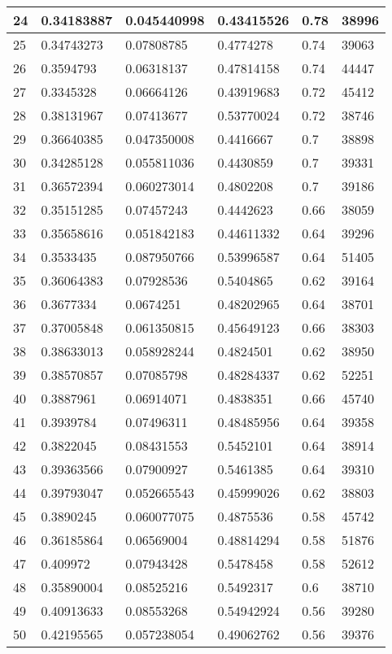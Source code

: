 \begin{longtable}{|l|l|l|l|l|l|}
24 & 0.34183887 & 0.045440998 & 0.43415526 & 0.78 & 38996 \\ \hline 
25 & 0.34743273 & 0.07808785 & 0.4774278 & 0.74 & 39063 \\ \hline 
26 & 0.3594793 & 0.06318137 & 0.47814158 & 0.74 & 44447 \\ \hline 
27 & 0.3345328 & 0.06664126 & 0.43919683 & 0.72 & 45412 \\ \hline 
28 & 0.38131967 & 0.07413677 & 0.53770024 & 0.72 & 38746 \\ \hline 
29 & 0.36640385 & 0.047350008 & 0.4416667 & 0.7 & 38898 \\ \hline 
30 & 0.34285128 & 0.055811036 & 0.4430859 & 0.7 & 39331 \\ \hline 
31 & 0.36572394 & 0.060273014 & 0.4802208 & 0.7 & 39186 \\ \hline 
32 & 0.35151285 & 0.07457243 & 0.4442623 & 0.66 & 38059 \\ \hline 
33 & 0.35658616 & 0.051842183 & 0.44611332 & 0.64 & 39296 \\ \hline 
34 & 0.3533435 & 0.087950766 & 0.53996587 & 0.64 & 51405 \\ \hline 
35 & 0.36064383 & 0.07928536 & 0.5404865 & 0.62 & 39164 \\ \hline 
36 & 0.3677334 & 0.0674251 & 0.48202965 & 0.64 & 38701 \\ \hline 
37 & 0.37005848 & 0.061350815 & 0.45649123 & 0.66 & 38303 \\ \hline 
38 & 0.38633013 & 0.058928244 & 0.4824501 & 0.62 & 38950 \\ \hline 
39 & 0.38570857 & 0.07085798 & 0.48284337 & 0.62 & 52251 \\ \hline 
40 & 0.3887961 & 0.06914071 & 0.4838351 & 0.66 & 45740 \\ \hline 
41 & 0.3939784 & 0.07496311 & 0.48485956 & 0.64 & 39358 \\ \hline 
42 & 0.3822045 & 0.08431553 & 0.5452101 & 0.64 & 38914 \\ \hline 
43 & 0.39363566 & 0.07900927 & 0.5461385 & 0.64 & 39310 \\ \hline 
44 & 0.39793047 & 0.052665543 & 0.45999026 & 0.62 & 38803 \\ \hline 
45 & 0.3890245 & 0.060077075 & 0.4875536 & 0.58 & 45742 \\ \hline 
46 & 0.36185864 & 0.06569004 & 0.48814294 & 0.58 & 51876 \\ \hline 
47 & 0.409972 & 0.07943428 & 0.5478458 & 0.58 & 52612 \\ \hline 
48 & 0.35890004 & 0.08525216 & 0.5492317 & 0.6 & 38710 \\ \hline 
49 & 0.40913633 & 0.08553268 & 0.54942924 & 0.56 & 39280 \\ \hline 
50 & 0.42195565 & 0.057238054 & 0.49062762 & 0.56 & 39376 \\ \hline 
\end{longtable}